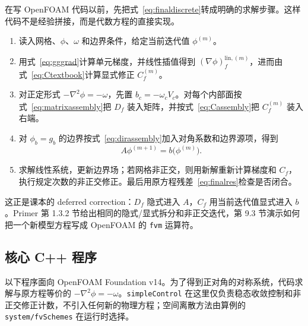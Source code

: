 \documentclass[UTF8,a4paper,11pt]{ctexart}
\begin{document}
在写 OpenFOAM 代码以前，先把式~\eqref{eq:finaldiscrete}转成明确的求解步骤。这样代码不是经验拼接，而是代数方程的直接实现。
\begin{enumerate}
  \item 读入网格、\(\phi\)、\(\omega\) 和边界条件，给定当前迭代值 \(\phi^{(m)}\)。
  \item 用式~\eqref{eq:gggrad}计算单元梯度，并线性插值得到 \((\nabla\phi)_f^{\mathrm{lin},(m)}\)，进而由式~\eqref{eq:Ctextbook}计算显式修正 \(C_f^{(m)}\)。
  \item 对正定形式 \(-\nabla^2\phi=-\omega\)，先置 \(b_c=-\omega_cV_c\)。对每个内部面按式~\eqref{eq:matrixassembly}把 \(D_f\) 装入矩阵，并按式~\eqref{eq:Cassembly}把 \(C_f^{(m)}\) 装入右端。
  \item 对 \(\phi_b=g_b\) 的边界按式~\eqref{eq:dirassembly}加入对角系数和边界源项，得到
  \begin{equation}
    A\phi^{(m+1)}=b\bigl(\phi^{(m)}\bigr).
  \end{equation}
  \item 求解线性系统，更新边界场；若网格非正交，则用新解重新计算梯度和 \(C_f\)，执行规定次数的非正交修正。最后用原方程残差~\eqref{eq:finalres}检查是否闭合。
\end{enumerate}
这正是课本的 deferred correction：\(D_f\) 隐式进入 \(A\)，\(C_f\) 用当前迭代值显式进入 \(b\)\cite[第 8.6.5、8.10.2 节]{Moukalled2016}。Primer 第 1.3.2 节给出相同的隐式/显式拆分和非正交迭代，第 9.3 节演示如何把一个新模型方程写成 OpenFOAM 的 \texttt{fvm} 运算符\cite[第 1.3.2、9.3 节]{OFPrimer}。

\subsection{核心 C++ 程序}

以下程序面向 OpenFOAM Foundation v14。为了得到正对角的对称系统，代码求解与原方程等价的
\(-\nabla^2\phi=-\omega\)。\texttt{simpleControl} 在这里仅负责稳态收敛控制和非正交修正计数，不引入任何新的物理方程；空间离散方法由算例的 \texttt{system/fvSchemes} 在运行时选择。
\end{document}
